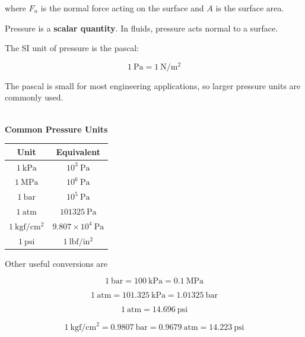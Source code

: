 \documentclass[12pt]{article}
\begin{document}
where $F_n$ is the normal force acting on the surface and $A$ is the surface area.

Pressure is a \textbf{scalar quantity}. In fluids, pressure acts normal to a surface.

The SI unit of pressure is the pascal:

\begin{equation*}
    1\ \mathrm{Pa} = 1\ \mathrm{N/m^2}
\end{equation*}

The pascal is small for most engineering applications, so larger pressure units are commonly used.

\textbf{\\ Common Pressure Units}

\begin{center}
    \begin{tabular}{|c|c|}
        \hline
        \textbf{Unit} & \textbf{Equivalent} \\
        \hline
        $1\ \mathrm{kPa}$ & $10^3\ \mathrm{Pa}$ \\
        \hline
        $1\ \mathrm{MPa}$ & $10^6\ \mathrm{Pa}$ \\
        \hline
        $1\ \mathrm{bar}$ & $10^5\ \mathrm{Pa}$ \\
        \hline
        $1\ \mathrm{atm}$ & $101325\ \mathrm{Pa}$ \\
        \hline
        $1\ \mathrm{kgf/cm^2}$ & $9.807\times10^4\ \mathrm{Pa}$ \\
        \hline
        $1\ \mathrm{psi}$ & $1\ \mathrm{lbf/in^2}$ \\
        \hline
    \end{tabular}
\end{center}

Other useful conversions are

\begin{equation*}
    1\ \mathrm{bar} = 100\ \mathrm{kPa} = 0.1\ \mathrm{MPa}
\end{equation*}

\begin{equation*}
    1\ \mathrm{atm} = 101.325\ \mathrm{kPa}
    = 1.01325\ \mathrm{bar}
\end{equation*}

\begin{equation*}
    1\ \mathrm{atm} = 14.696\ \mathrm{psi}
\end{equation*}

\begin{equation*}
    1\ \mathrm{kgf/cm^2}
    = 0.9807\ \mathrm{bar}
    = 0.9679\ \mathrm{atm}
    = 14.223\ \mathrm{psi}
\end{equation*}
\end{document}
